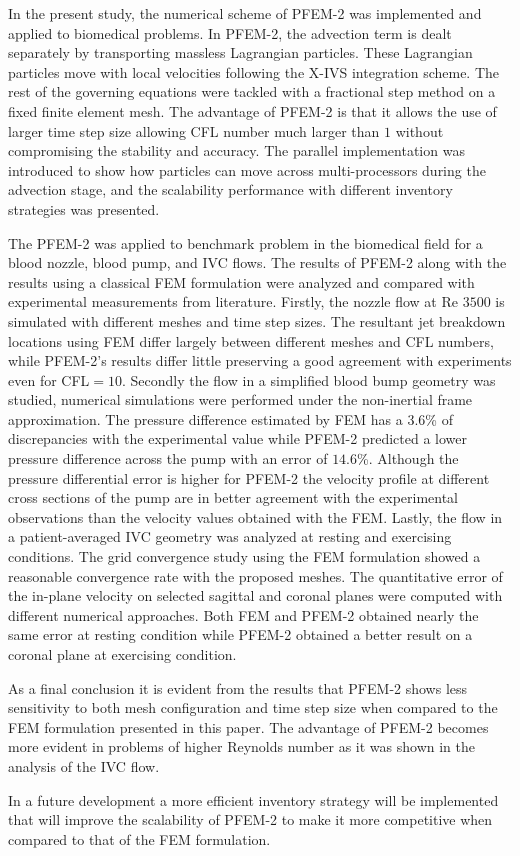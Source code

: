 In the present study, the numerical scheme of PFEM-2 was implemented and applied to biomedical problems. In PFEM-2, the advection term is dealt separately by transporting massless Lagrangian particles. These Lagrangian particles move with local velocities following the X-IVS integration scheme. The rest of the governing equations were tackled with a fractional step method on a fixed finite element mesh. The advantage of PFEM-2 is that it allows the use of larger time step size allowing CFL number much larger than $1$ without compromising the stability and accuracy. The parallel implementation was introduced to show how particles can move across multi-processors during the advection stage, and the scalability performance with different inventory strategies was presented. 

The PFEM-2 was applied to benchmark problem in the biomedical field for a blood nozzle, blood pump, and IVC flows. The results of PFEM-2 along with the results using a classical FEM formulation were analyzed and compared with experimental measurements from literature. Firstly, the nozzle flow at Re $3500$ is simulated with different meshes and time step sizes. The resultant jet breakdown locations using FEM differ largely between different meshes and CFL numbers, while PFEM-2's results differ little preserving a good agreement with experiments even for CFL$=10$. Secondly the flow in a simplified blood bump geometry was studied, numerical simulations were performed under the non-inertial frame approximation. The pressure difference estimated by FEM has a $3.6$\% of discrepancies with the experimental value while PFEM-2 predicted a lower pressure difference across the pump with an error of $14.6$\%. Although the pressure differential error is higher for PFEM-2 the velocity profile at different cross sections of the pump are in better agreement with the experimental observations than the velocity values obtained with the FEM. Lastly, the flow in a patient-averaged IVC geometry was analyzed at resting and exercising conditions. The grid convergence study using the FEM formulation showed a reasonable convergence rate with the proposed meshes. The quantitative error of the in-plane velocity on selected sagittal and coronal planes were computed with different numerical approaches. Both FEM and PFEM-2 obtained nearly the same error at resting condition while PFEM-2 obtained a better result on a coronal plane at exercising condition.

As a final conclusion it is evident from the results that PFEM-2 shows less sensitivity to both mesh configuration and time step size when compared to the FEM formulation presented in this paper. The advantage of PFEM-2 becomes more evident in problems of higher Reynolds number as it was shown in the analysis of the IVC flow.

In a future development a more efficient inventory strategy will be implemented that will improve the scalability of PFEM-2 to make it more competitive when compared to that of the FEM formulation.
